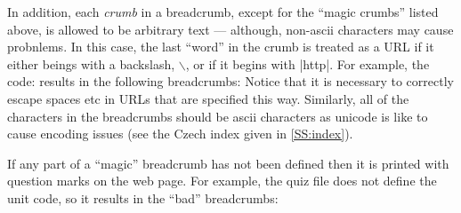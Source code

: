\documentclass[svgnames]{article}
\makeatletter
\newcommand\macroIndex[1]{%
  \lowercase{\def\temp{#1}}%
  \expandafter\index\expandafter{\temp@\textbackslash#1}%
}
\makeatother
\begin{document}

    \noindent
    In addition, each \textit{crumb} in a breadcrumb, except for the
    ``magic crumbs'' listed above, is allowed to be arbitrary text ---
    although, non-ascii characters may cause probnlems. In this case, the
    last ``word'' in the crumb is treated as a URL if it either beings
    with a backslash, $\backslash$, or if it begins with
    \BashCode|http|.  For example, the code:
    \noindent
    results in the following breadcrumbs:
    Notice that it is necessary to correctly escape spaces etc in
    URLs that are specified this way. Similarly, all of the characters
    in the breadcrumbs should be ascii characters as unicode is like to
    cause encoding issues (see the Czech index given in
    \autoref{SS:index}).

    If any part of a ``magic'' breadcrumb has not been defined then it
    is printed with question marks on the web page. For example, the quiz
    file
    does not define the unit code, so it results in the ``bad'' breadcrumbs:
\end{document}
